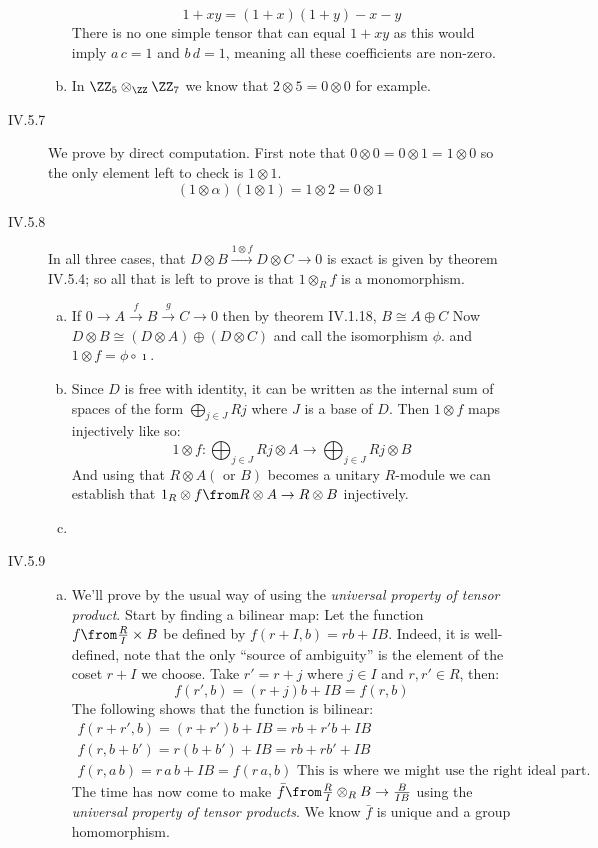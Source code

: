 \begin{description}
\begin{enumerate}[(a)]
            $$1+xy= (1+x)(1+y) - x - y$$
            There is no one simple tensor that can equal $1+xy$ as this would imply $a\,c=1$ and $b\,d=1$, meaning all these coefficients are non-zero.
        \item In $\ZZ_5\otimes_\ZZ \ZZ_7$ we know that $2\otimes 5=0\otimes 0$ for example.
    \end{enumerate}
\item[IV.5.7] We prove by direct computation. First note that $0\otimes 0 = 0\otimes 1 = 1\otimes 0$ so the only element left to check is $1\otimes 1$.
    $$(1\otimes\alpha)(1\otimes 1) = 1\otimes 2 = 0\otimes 1$$
\item[IV.5.8]
    In all three cases, that $D\otimes B \xrightarrow{1\otimes f} D\otimes C \to 0$ is exact is given by theorem IV.5.4; so all that is left to prove is that $1\otimes_R f$ is a monomorphism.
    \begin{enumerate}[(a)]
        \item If $0\to A \xrightarrow{f} B\xrightarrow{g} C \to 0$ then by theorem IV.1.18, $B\cong A\oplus C$  Now $D\otimes B\cong (D\otimes A)\oplus(D\otimes C)$ and call the isomorphism $\phi$. and $1\otimes f = \phi \circ \imath$. 
        \item Since $D$ is free with identity, it can be written as the internal sum of spaces of the form $\bigoplus_{j\in J} Rj$ where $J$ is a base of $D$. Then $1\otimes f$ maps injectively like so:
            $$1\otimes f : \bigoplus_{j\in J} Rj\otimes A \to \bigoplus_{j\in J} Rj\otimes B$$
            And using that $R\otimes A(\text{ or } B)$ becomes a unitary  $R$-module we can establish that $1_R\otimes f\from R\otimes A \to R\otimes B$ injectively.
        \item 

    \end{enumerate}
\item[IV.5.9]
    \begin{enumerate}[(a)]
        \item We'll prove by the usual way of using the \emph{universal property of tensor product}. Start by finding a bilinear map:
            Let the function $f\from \frac RI \times B$ be defined by $f(r+I,b) = rb + IB$. 
            Indeed, it is well-defined, note that the only ``source of ambiguity'' is the element of the coset $r+I$ we choose. Take $r'= r+j$ where $j\in I$ and $r,r'\in R$, then:
            $$f(r',b) = (r+j)b + IB = f(r,b)$$
            The following  shows that the function is bilinear:
            \begin{gather*}
                f(r+r',b) = (r+r')b +IB = rb+r'b +IB\\
                f(r,b+b') = r(b+b') +IB = rb+rb' +IB\\
                f(r,a\, b) = r\, a\, b +IB = f(r\, a, b) \text{ This is where we might use the right ideal part.}
            \end{gather*}
            The time has now come to make $\bar f \from \frac RI\otimes_R B \to \frac B{IB}$ using  the \emph{universal property of tensor products}. We know $\bar f$ is unique and a group homomorphism.


\end{enumerate}
\end{description}
